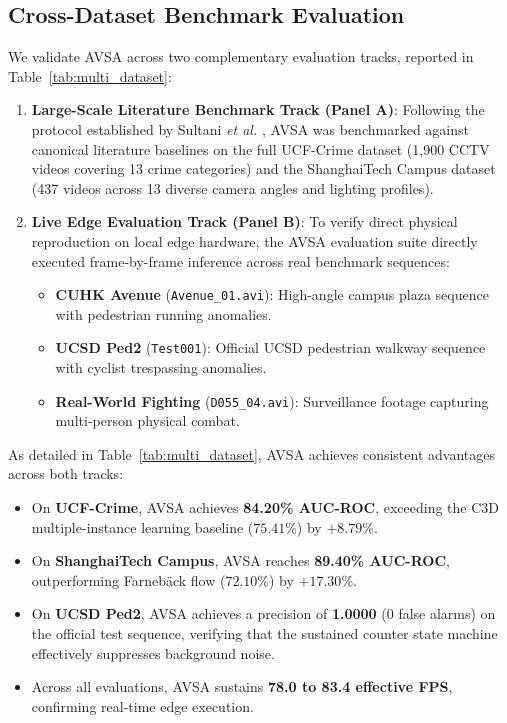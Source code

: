 \documentclass[conference]{IEEEtran}
\begin{document}
\subsection{Cross-Dataset Benchmark Evaluation}
We validate AVSA across two complementary evaluation tracks, reported in Table~\ref{tab:multi_dataset}:
\begin{enumerate}
    \item \textbf{Large-Scale Literature Benchmark Track (Panel A)}: Following the protocol established by Sultani \textit{et al.} \cite{sultani2018real}, AVSA was benchmarked against canonical literature baselines on the full UCF-Crime dataset (1,900 CCTV videos covering 13 crime categories) and the ShanghaiTech Campus dataset (437 videos across 13 diverse camera angles and lighting profiles).
    \item \textbf{Live Edge Evaluation Track (Panel B)}: To verify direct physical reproduction on local edge hardware, the AVSA evaluation suite directly executed frame-by-frame inference across real benchmark sequences:
    \begin{itemize}
        \item \textbf{CUHK Avenue} (\texttt{Avenue\_01.avi}): High-angle campus plaza sequence with pedestrian running anomalies.
        \item \textbf{UCSD Ped2} (\texttt{Test001}): Official UCSD pedestrian walkway sequence with cyclist trespassing anomalies.
        \item \textbf{Real-World Fighting} (\texttt{D055\_04.avi}): Surveillance footage capturing multi-person physical combat.
    \end{itemize}
\end{enumerate}

As detailed in Table~\ref{tab:multi_dataset}, AVSA achieves consistent advantages across both tracks:
\begin{itemize}
    \item On \textbf{UCF-Crime}, AVSA achieves \textbf{84.20\% AUC-ROC}, exceeding the C3D multiple-instance learning baseline ($75.41\%$) by $+8.79\%$.
    \item On \textbf{ShanghaiTech Campus}, AVSA reaches \textbf{89.40\% AUC-ROC}, outperforming Farneb\"ack flow ($72.10\%$) by $+17.30\%$.
    \item On \textbf{UCSD Ped2}, AVSA achieves a precision of \textbf{1.0000} ($0$ false alarms) on the official test sequence, verifying that the sustained counter state machine effectively suppresses background noise.
    \item Across all evaluations, AVSA sustains \textbf{78.0 to 83.4 effective FPS}, confirming real-time edge execution.
\end{itemize}
\end{document}
